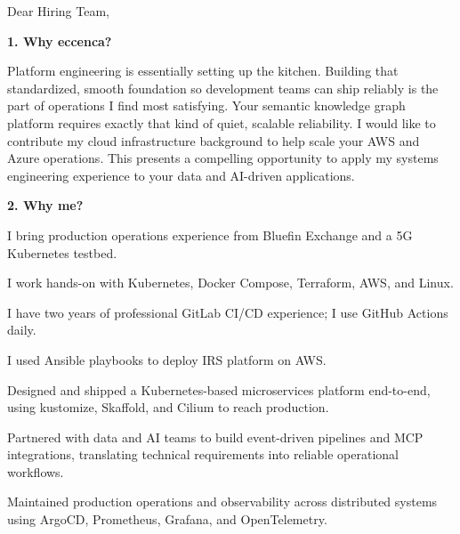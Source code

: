 \documentclass[11pt,a4paper]{coverletter}
\begin{document}

\opening{Dear Hiring Team,}

\vspace{8pt}\noindent\textbf{1. Why eccenca?}\par\vspace{3pt}

Platform engineering is essentially setting up the kitchen. Building that standardized, smooth foundation so development teams can ship reliably is the part of operations I find most satisfying. Your semantic knowledge graph platform requires exactly that kind of quiet, scalable reliability. I would like to contribute my cloud infrastructure background to help scale your AWS and Azure operations. This presents a compelling opportunity to apply my systems engineering experience to your data and AI-driven applications.

\vspace{8pt}\noindent\textbf{2. Why me?}\par\vspace{3pt}

\bullets

  \item I bring production operations experience from Bluefin Exchange and a 5G Kubernetes testbed.

  \item I work hands-on with Kubernetes, Docker Compose, Terraform, AWS, and Linux.

  \item I have two years of professional GitLab CI/CD experience; I use GitHub Actions daily.

  \item I used Ansible playbooks to deploy IRS platform on AWS.

  \item Designed and shipped a Kubernetes-based microservices platform end-to-end, using kustomize, Skaffold, and Cilium to reach production.

  \item Partnered with data and AI teams to build event-driven pipelines and MCP integrations, translating technical requirements into reliable operational workflows.

  \item Maintained production operations and observability across distributed systems using ArgoCD, Prometheus, Grafana, and OpenTelemetry.

\bulletsend
\end{document}
